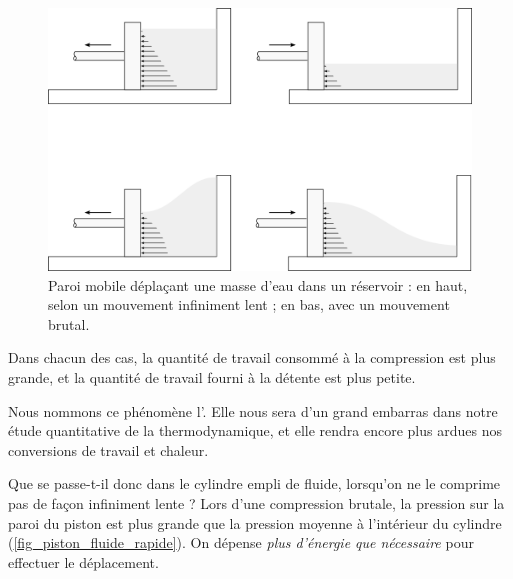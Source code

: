 		\begin{figure}[htb!]%
			\begin{center}
				\includegraphics[width=\textwidth]{images/mouvement_rapide_niveau_eau.png}
			\end{center}
			\caption{Paroi mobile déplaçant une masse d’eau dans un réservoir : en haut, selon un mouvement infiniment lent ; en bas, avec un mouvement brutal.}%
			\label{fig_baignoire}
		\end{figure}
		
		Dans chacun des cas, la quantité de travail consommé à la compression est plus grande, et la quantité de travail fourni à la détente est plus petite.
		
		Nous nommons ce phénomène l’. Elle nous sera d’un grand embarras dans notre étude quantitative de la thermodynamique, et elle rendra encore plus ardues nos conversions de travail et chaleur.

		Que se passe-t-il donc dans le cylindre empli de fluide, lorsqu’on ne le comprime pas de façon infiniment lente ? Lors d’une compression brutale, la pression sur la paroi du piston est plus grande que la pression moyenne à l’intérieur du cylindre (\cref{fig_piston_fluide_rapide}). On dépense \emph{plus d’énergie que nécessaire} pour effectuer le déplacement.

